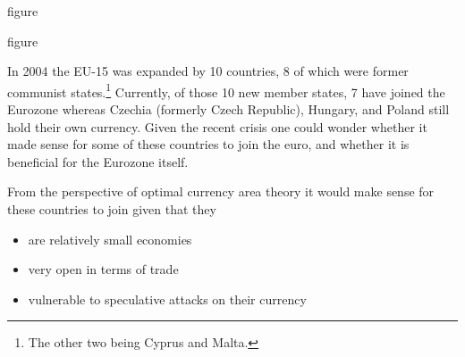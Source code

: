 \documentclass{beamer}
\begin{document}
\begin{frame}
  figure
\end{frame}

\begin{frame}
  figure
\end{frame}

\begin{frame}
  In 2004 the EU-15 was expanded by 10 countries, 8 of which were former communist states.\footnote{The other two being Cyprus and Malta.}
Currently, of those 10 new member states, 7 have joined the Eurozone whereas Czechia (formerly Czech Republic), Hungary, and Poland still hold their own currency. 
Given the recent crisis one could wonder whether it made sense for some of these countries to join the euro, and whether it is beneficial for the Eurozone itself. 
\end{frame}

\begin{frame}
  From the perspective of optimal currency area theory it would make sense for these countries to join given that they
\begin{itemize}
  \item are relatively small economies
  \item very open in terms of trade
  \item vulnerable to speculative attacks on their currency
\end{itemize}
\end{frame}


\end{document}
